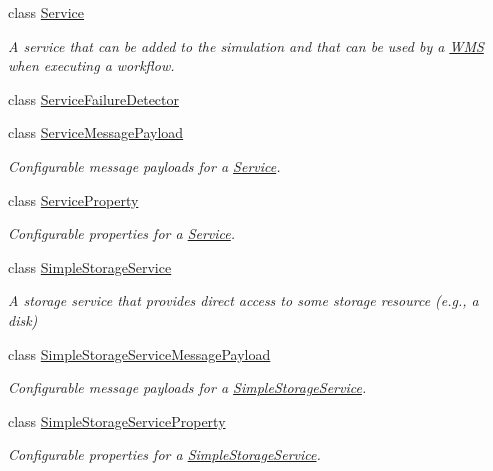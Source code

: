 \begin{DoxyCompactItemize}
class \hyperlink{classwrench_1_1_service}{Service}
\begin{DoxyCompactList}\small\item\em A service that can be added to the simulation and that can be used by a \hyperlink{classwrench_1_1_w_m_s}{W\+MS} when executing a workflow. \end{DoxyCompactList}\item 
class \hyperlink{classwrench_1_1_service_failure_detector}{Service\+Failure\+Detector}
\item 
class \hyperlink{classwrench_1_1_service_message_payload}{Service\+Message\+Payload}
\begin{DoxyCompactList}\small\item\em Configurable message payloads for a \hyperlink{classwrench_1_1_service}{Service}. \end{DoxyCompactList}\item 
class \hyperlink{classwrench_1_1_service_property}{Service\+Property}
\begin{DoxyCompactList}\small\item\em Configurable properties for a \hyperlink{classwrench_1_1_service}{Service}. \end{DoxyCompactList}\item 
class \hyperlink{classwrench_1_1_simple_storage_service}{Simple\+Storage\+Service}
\begin{DoxyCompactList}\small\item\em A storage service that provides direct access to some storage resource (e.\+g., a disk) \end{DoxyCompactList}\item 
class \hyperlink{classwrench_1_1_simple_storage_service_message_payload}{Simple\+Storage\+Service\+Message\+Payload}
\begin{DoxyCompactList}\small\item\em Configurable message payloads for a \hyperlink{classwrench_1_1_simple_storage_service}{Simple\+Storage\+Service}. \end{DoxyCompactList}\item 
class \hyperlink{classwrench_1_1_simple_storage_service_property}{Simple\+Storage\+Service\+Property}
\begin{DoxyCompactList}\small\item\em Configurable properties for a \hyperlink{classwrench_1_1_simple_storage_service}{Simple\+Storage\+Service}. \end{DoxyCompactList}\item 

\end{DoxyCompactItemize}
